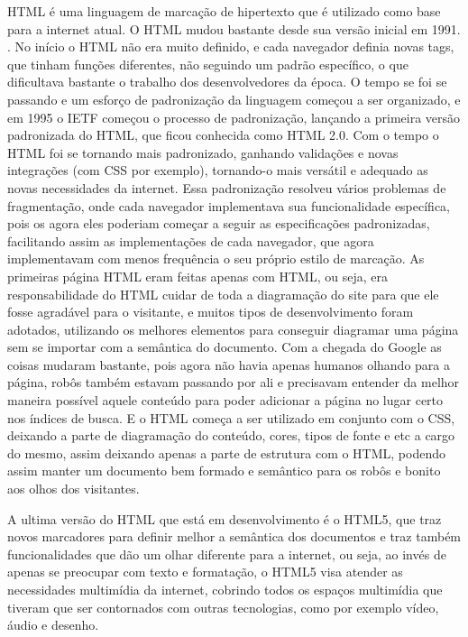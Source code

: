 HTML é uma linguagem de marcação de hipertexto que é utilizado como base para a internet
atual. O HTML mudou bastante desde sua versão inicial em 1991.
\cite{powell2003html}.
No início o HTML não era muito definido, e cada
navegador definia novas tags, que tinham funções diferentes,
não seguindo um padrão específico, o que dificultava
bastante o trabalho dos desenvolvedores da época.
O tempo se foi se passando e um esforço de padronização da linguagem
começou a ser organizado, e em 1995 o IETF começou o processo de
padronização, lançando a primeira versão padronizada do HTML, que ficou conhecida como HTML 2.0.
Com o tempo o HTML foi se tornando mais padronizado, ganhando validações e novas integrações
(com CSS por exemplo), tornando-o mais versátil e adequado as novas necessidades da
internet.
Essa padronização resolveu vários problemas de fragmentação, onde cada
navegador implementava sua funcionalidade específica, pois os agora
eles poderiam começar a seguir as especificações padronizadas,
facilitando assim as implementações de cada navegador, que agora implementavam com
menos frequência o seu próprio estilo de marcação.
As primeiras página HTML eram feitas apenas com HTML, ou seja, era
responsabilidade do HTML cuidar de toda a diagramação do site para que
ele fosse agradável para o visitante, e muitos tipos de
desenvolvimento foram adotados, utilizando os melhores elementos para
conseguir diagramar uma página sem se importar com a semântica do
documento. Com a chegada do Google as coisas mudaram bastante, pois
agora não havia apenas humanos olhando para a página, robôs também
estavam passando por ali e precisavam entender da melhor maneira
possível aquele conteúdo para poder adicionar a página no lugar certo
nos índices de busca. E o HTML começa a ser utilizado em conjunto com
o CSS, deixando a parte de diagramação do conteúdo, cores, tipos de
fonte e etc a cargo do mesmo, assim deixando apenas a parte de
estrutura com o HTML, podendo assim manter um documento bem formado e
semântico para os robôs e bonito aos olhos dos visitantes.

A ultima versão do HTML que está em desenvolvimento é o HTML5, que
traz novos marcadores para definir melhor a semântica dos documentos e
traz também funcionalidades que dão um olhar diferente para a internet,
ou seja, ao invés de apenas se preocupar com texto e formatação, o HTML5
visa atender as necessidades multimídia da internet, cobrindo todos os
espaços multimídia que tiveram que ser contornados com outras tecnologias,
como por exemplo vídeo, áudio e desenho.

